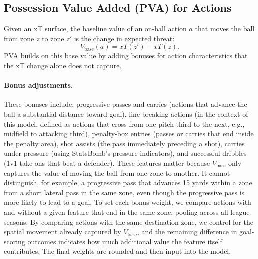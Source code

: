 \documentclass[12pt,a4paper]{article}
\begin{document}
\subsection{Possession Value Added (PVA) for Actions}
Given an xT surface, the baseline value of an on-ball action $a$ that moves the ball from zone $z$ to zone $z'$ is the change in expected threat:
\begin{equation}
V_{\text{base}}(a) = xT(z') - xT(z).
\end{equation}
PVA builds on this base value by adding bonuses for action characteristics that the xT change alone does not capture.

\paragraph{Bonus adjustments.}
These bonuses include: progressive passes and carries (actions that advance the ball a substantial distance toward goal), line-breaking actions (in the context of this model, defined as actions that cross from one pitch third to the next, e.g., midfield to attacking third), penalty-box entries (passes or carries that end inside the penalty area), shot assists (the pass immediately preceding a shot), carries under pressure (using StatsBomb's pressure indicators), and successful dribbles (1v1 take-ons that beat a defender). These features matter because $V_{\text{base}}$ only captures the value of moving the ball from one zone to another. It cannot distinguish, for example, a progressive pass that advances 15 yards within a zone from a short lateral pass in the same zone, even though the progressive pass is more likely to lead to a goal. To set each bonus weight, we compare actions with and without a given feature that end in the same zone, pooling across all league-seasons. By comparing actions with the same destination zone, we control for the spatial movement already captured by $V_{\text{base}}$, and the remaining difference in goal-scoring outcomes indicates how much additional value the feature itself contributes. The final weights are rounded and then input into the model.
\end{document}

